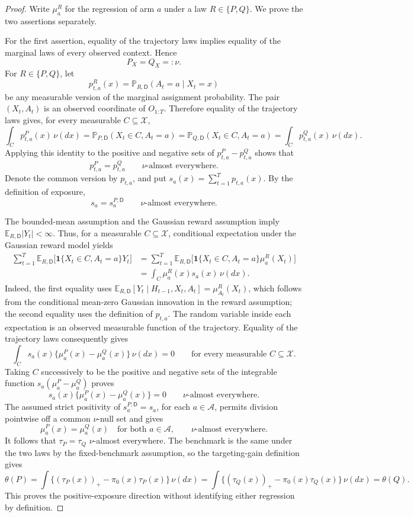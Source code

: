 \documentclass{article}
\begin{document}
\begin{proof}
Write \(\mu_a^R\) for the regression of arm \(a\) under a law \(R\in\{P,Q\}\).  We prove the two assertions separately.

For the first assertion, equality of the trajectory laws implies equality of the marginal laws of every observed context.  Hence
\[
P_X=Q_X=:\nu.
\]
For \(R\in\{P,Q\}\), let
\[
p_{t,a}^R(x)=\mathbb P_{R,\mathsf D}(A_t=a\mid X_t=x)
\]
be any measurable version of the marginal assignment probability.  The pair \((X_t,A_t)\) is an observed coordinate of \(O_{1:T}\).  Therefore equality of the trajectory laws gives, for every measurable \(C\subseteq\mathcal X\),
\[
\int_C p_{t,a}^P(x)\,\nu(dx)
=\mathbb P_{P,\mathsf D}(X_t\in C,A_t=a)
=\mathbb P_{Q,\mathsf D}(X_t\in C,A_t=a)
=\int_C p_{t,a}^Q(x)\,\nu(dx).
\]
Applying this identity to the positive and negative sets of \(p_{t,a}^P-p_{t,a}^Q\) shows that
\[
p_{t,a}^P=p_{t,a}^Q\qquad \nu\text{-almost everywhere}.
\]
Denote the common version by \(p_{t,a}\), and put \(s_a(x)=\sum_{t=1}^T p_{t,a}(x)\).  By the definition of exposure,
\[
s_a=s_a^{P,\mathsf D}\qquad \nu\text{-almost everywhere}.
\]

The bounded-mean assumption and the Gaussian reward assumption imply \(\mathbb E_{R,\mathsf D}|Y_t|<\infty\).  Thus, for a measurable \(C\subseteq\mathcal X\), conditional expectation under the Gaussian reward model yields
\[
\begin{aligned}
\sum_{t=1}^T
\mathbb E_{R,\mathsf D}
 \bigl[\mathbf 1\{X_t\in C,A_t=a\}Y_t\bigr]
&=\sum_{t=1}^T
\mathbb E_{R,\mathsf D}
 \bigl[\mathbf 1\{X_t\in C,A_t=a\}\mu_a^R(X_t)\bigr]\\
&=\int_C \mu_a^R(x)s_a(x)\,\nu(dx).
\end{aligned}
\]
Indeed, the first equality uses
\(\mathbb E_{R,\mathsf D}[Y_t\mid H_{t-1},X_t,A_t]
=\mu_{A_t}^R(X_t)\), which follows from the conditional mean-zero Gaussian innovation in the reward assumption; the second equality uses the definition of \(p_{t,a}\).  The random variable inside each expectation is an observed measurable function of the trajectory.  Equality of the trajectory laws consequently gives
\[
\int_C s_a(x)\{\mu_a^P(x)-\mu_a^Q(x)\}\,\nu(dx)=0
\qquad\text{for every measurable }C\subseteq\mathcal X.
\]
Taking \(C\) successively to be the positive and negative sets of the integrable function
\(s_a(\mu_a^P-\mu_a^Q)\) proves
\[
s_a(x)\{\mu_a^P(x)-\mu_a^Q(x)\}=0
\qquad \nu\text{-almost everywhere}.
\]
The assumed strict positivity of \(s_a^{P,\mathsf D}=s_a\), for each \(a\in\mathcal A\), permits division pointwise off a common \(\nu\)-null set and gives
\[
\mu_a^P(x)=\mu_a^Q(x)
\quad\text{for both }a\in\mathcal A,
\qquad \nu\text{-almost everywhere}.
\]
It follows that \(\tau_P=\tau_Q\) \(\nu\)-almost everywhere.  The benchmark is the same under the two laws by the fixed-benchmark assumption, so the targeting-gain definition gives
\[
\theta(P)
=\int\{(\tau_P(x))_+-\pi_0(x)\tau_P(x)\}\,\nu(dx)
=\int\{(\tau_Q(x))_+-\pi_0(x)\tau_Q(x)\}\,\nu(dx)
=\theta(Q).
\]
This proves the positive-exposure direction without identifying either regression by definition.


\end{proof}
\end{document}
